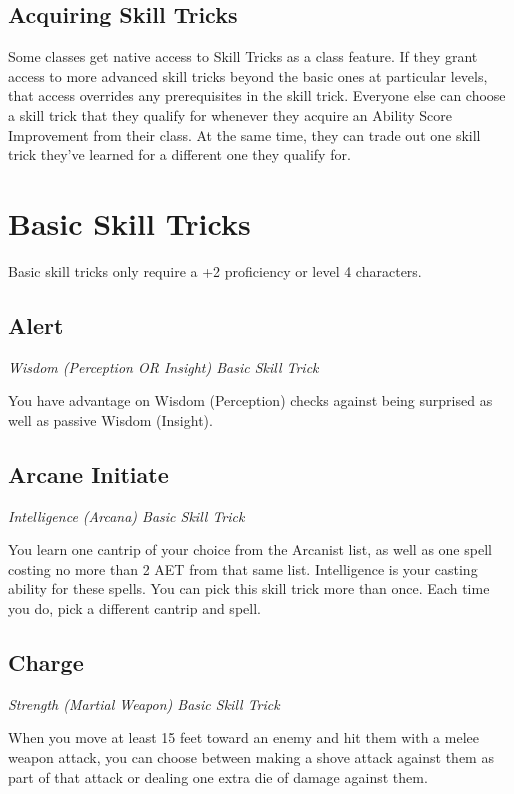 \subsection{Acquiring Skill Tricks}
\label{subsec:acquiring-skill-tricks}

Some classes get native access to Skill Tricks as a class feature. If they grant access to more advanced skill tricks beyond the basic ones at particular levels, that access overrides any prerequisites in the skill trick. Everyone else can choose a skill trick that they qualify for whenever they acquire an Ability Score Improvement from their class. At the same time, they can trade out one skill trick they've learned for a different one they qualify for.

\section{Basic Skill Tricks}
\label{sec:skill-tricks-basic}

Basic skill tricks only require a +2 proficiency or level 4 characters.

\subsection{Alert}\label{st:alert}

\textit{Wisdom (Perception OR Insight) Basic Skill Trick}

You have advantage on Wisdom (Perception) checks against being surprised as well as passive Wisdom (Insight).

\subsection{Arcane Initiate}

\textit{Intelligence (Arcana) Basic Skill Trick}

You learn one cantrip of your choice from the Arcanist list, as well as one spell costing no more than 2 AET from that same list. Intelligence is your casting ability for these spells. You can pick this skill trick more than once. Each time you do, pick a different cantrip and spell.

\subsection{Charge}

\textit{Strength (Martial Weapon) Basic Skill Trick}

When you move at least 15 feet toward an enemy and hit them with a melee weapon attack, you can choose between making a shove attack against them as part of that attack or dealing one extra die of damage against them.


